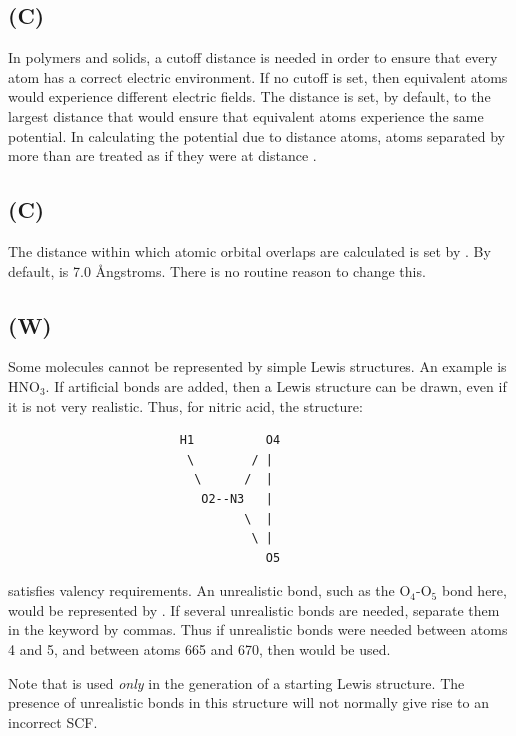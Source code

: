 \subsection*{ (C)}
In polymers and solids, a cutoff distance is needed in order to ensure that
every atom has a correct electric environment.  If no cutoff is set, then
equivalent atoms would experience different electric fields.  The 
distance is set, by default, to the largest distance that would ensure that
equivalent atoms experience the same potential.  In calculating the potential
due to distance atoms, atoms separated by more than  are treated
as if they were at distance .

\subsection*{ (C)}
The distance within which atomic orbital overlaps are calculated is set by
.  By default,  is 7.0 \AA ngstroms. There is no
routine reason to change this.

\subsection*{ (W)}
\label{cvb}
Some molecules cannot be represented by simple Lewis structures.  An example is
HNO$_3$. If artificial bonds are added, then a Lewis structure can be drawn,
even if it is not very realistic.  Thus, for nitric acid, the structure:
\begin{verbatim}
                        H1          O4
                         \        / |
                          \      /  |
                           O2--N3   |
                                 \  |
                                  \ |
                                    O5
\end{verbatim}
satisfies valency requirements.  An unrealistic bond, such as the O$_4$-O$_5$
bond here, would be represented by .  If several unrealistic
bonds are needed, separate them in the keyword by commas.  Thus if unrealistic
bonds were needed between atoms 4 and 5, and between atoms 665 and 670, then
 would be used.

Note that  is used {\em only} in the generation of a starting Lewis
structure. The presence of unrealistic bonds in this structure will not
normally give rise to an incorrect SCF.


